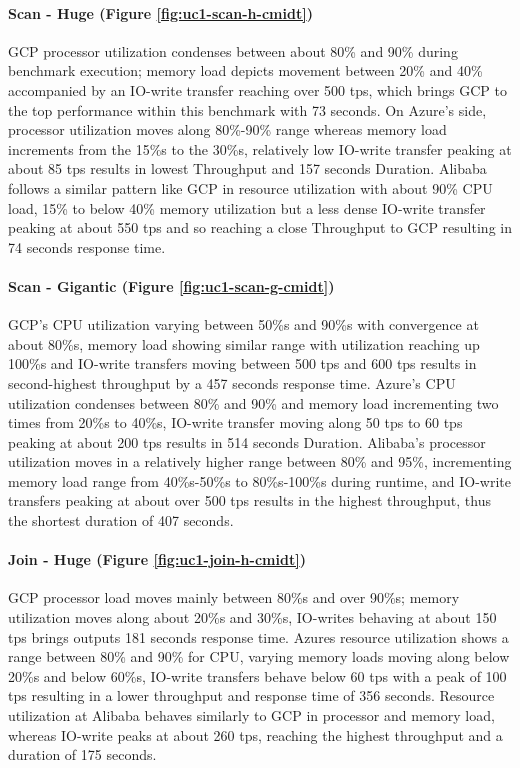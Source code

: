 \documentclass[review]{elsarticle}
\begin{document}
\paragraph{Scan - Huge (Figure \ref{fig:uc1-scan-h-cmidt})}GCP processor utilization condenses between about 80\% and 90\% during benchmark execution; memory load depicts movement between 20\% and 40\% accompanied by an IO-write transfer reaching over 500 tps, which brings GCP to the top performance within this benchmark with 73 seconds. On Azure's side, processor utilization moves along 80\%-90\% range whereas memory load increments from the 15\%s to the 30\%s, relatively low IO-write transfer peaking at about 85 tps results in lowest Throughput and 157 seconds Duration. Alibaba follows a similar pattern like GCP in resource utilization with about 90\% CPU load, 15\% to below 40\% memory utilization but a less dense IO-write transfer peaking at about 550 tps and so reaching a close Throughput to GCP resulting in 74 seconds response time.

\paragraph{Scan - Gigantic (Figure \ref{fig:uc1-scan-g-cmidt})}GCP's CPU utilization varying between 50\%s and 90\%s with convergence at about 80\%s, memory load showing similar range with utilization reaching up 100\%s and IO-write transfers moving between 500 tps and 600 tps results in second-highest throughput by a 457 seconds response time. Azure's CPU utilization condenses between 80\% and 90\% and memory load incrementing two times from 20\%s to 40\%s, IO-write transfer moving along 50 tps to 60 tps peaking at about 200 tps results in 514 seconds Duration. Alibaba's processor utilization moves in a relatively higher range between 80\% and 95\%, incrementing memory load range from 40\%s-50\%s to 80\%s-100\%s during runtime, and IO-write transfers peaking at about over 500 tps results in the highest throughput, thus the shortest duration of 407 seconds.

\paragraph{Join - Huge (Figure \ref{fig:uc1-join-h-cmidt})}GCP processor load moves mainly between 80\%s and over 90\%s; memory utilization moves along about 20\%s and 30\%s, IO-writes behaving at about 150 tps brings outputs 181 seconds response time. Azures resource utilization shows a range between 80\% and 90\% for CPU, varying memory loads moving along below 20\%s and below 60\%s, IO-write transfers behave below 60 tps with a peak of 100 tps resulting in a lower throughput and response time of 356 seconds. Resource utilization at Alibaba behaves similarly to GCP in processor and memory load, whereas IO-write peaks at about 260 tps, reaching the highest throughput and a duration of 175 seconds.
\end{document}
